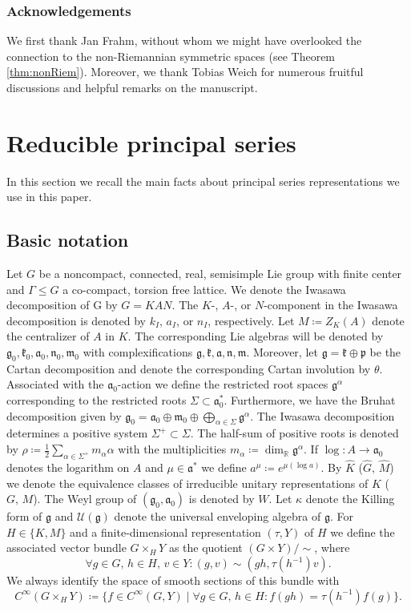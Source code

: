 \documentclass[JEP,XML,SOM,NoFloatCountersInSection,Unicode,published]{cedram}
\theoremstyle{definition}
\newcommand{\mc}[1]{\ensuremath{\mathcal{#1}}}
\newcommand{\mf}[1]{\ensuremath{\mathfrak{#1}}}
\newcommand{\rhoa}{\ensuremath{\rho}}
\newcommand{\R}{\ensuremath{\mathbb{R}}}
\begin{document}
\subsubsection*{Acknowledgements} We first thank Jan Frahm, without whom we might have overlooked the connection to the non-Riemannian symmetric spaces (see Theorem \ref{thm:nonRiem}). Moreover, we thank Tobias Weich for numerous fruitful discussions and helpful remarks on the manuscript.

\section{Reducible principal series}\label{sec:red_princ_series}
In this section we recall the main facts about principal series representations we use in this paper.
\subsection{Basic notation}
Let $G$ be a noncompact, connected, real, semisimple Lie group with finite center and $\Gamma\leq G$ a co-compact, torsion free lattice. We denote the Iwasawa decomposition of G by $G=KAN$. The $K$-, $A$-, or $N$-component in the Iwasawa decomposition is denoted by $k_I$, $a_I$, or $n_I$, respectively. Let $M\coloneqq Z_K(A)$ denote the centralizer of $A$ in $K$. The corresponding Lie algebras will be denoted by $\mf{g}_0,\mf{k}_0,\mf{a}_0,\mf{n}_0,\mf{m}_0$ with complexifications $\mf g,\mf k,\mf a,\mf n,\mf m$. Moreover, let $\mf g=\mf k\oplus\mf p$ be the Cartan decomposition and denote the corresponding Cartan involution by $\theta$. Associated with the $\mf a_0$-action we define the restricted root spaces $\mf g^\alpha$ corresponding to the restricted roots $\Sigma\subset\mf a_0^*$. Furthermore, we have the Bruhat decomposition given by $\mf g_0=\mf a_0\oplus\mf m_0\oplus\bigoplus_{\alpha\in\Sigma}\mf g^\alpha$. The Iwasawa decomposition determines a positive system $\Sigma^+\subset\Sigma$. The half-sum of positive roots is denoted by $\rhoa\coloneqq\frac{1}{2}\sum_{\alpha\in\Sigma^+}m_\alpha\alpha$ with the multiplicities $m_\alpha\coloneqq\dim_\R\mf g^\alpha$. If $\log:A\to\mf a_0$ denotes the logarithm on $A$ and $\mu\in\mf a^*$ we define $a^\mu\coloneqq e^{\mu(\log a)}$. By $\hat K$ (\resp $\hat G,\, \hat M$) we denote the equivalence classes of irreducible unitary representations of $K$ (\resp $G,\, M$). The Weyl group of $(\mf g_0,\mf a_0)$ is denoted by $W$. Let $\kappa$ denote the Killing form of $\mf g$ and $\mc U(\mf g)$ denote the universal envelop\-ing algebra of $\mf g$. For $H\in\{K,M\}$ and a finite-dimensional representation $(\tau,Y)$ of $H$ we define the associated vector bundle $G\times_HY$ as the quotient $(G\times Y)/\sim$, where
\[
\forall g\in G,\, h\in H,\, v\in Y\colon (g,v)\sim(gh,\tau(h^{-1})v).
\]
We always identify the space of smooth sections of this bundle with
\[
C^\infty(G\times_HY)\coloneqq\{f\in C^\infty(G,Y)\mid \forall g\in G,\, h\in H\colon f(gh)=\tau(h^{-1})f(g)\}.
\]
\end{document}
